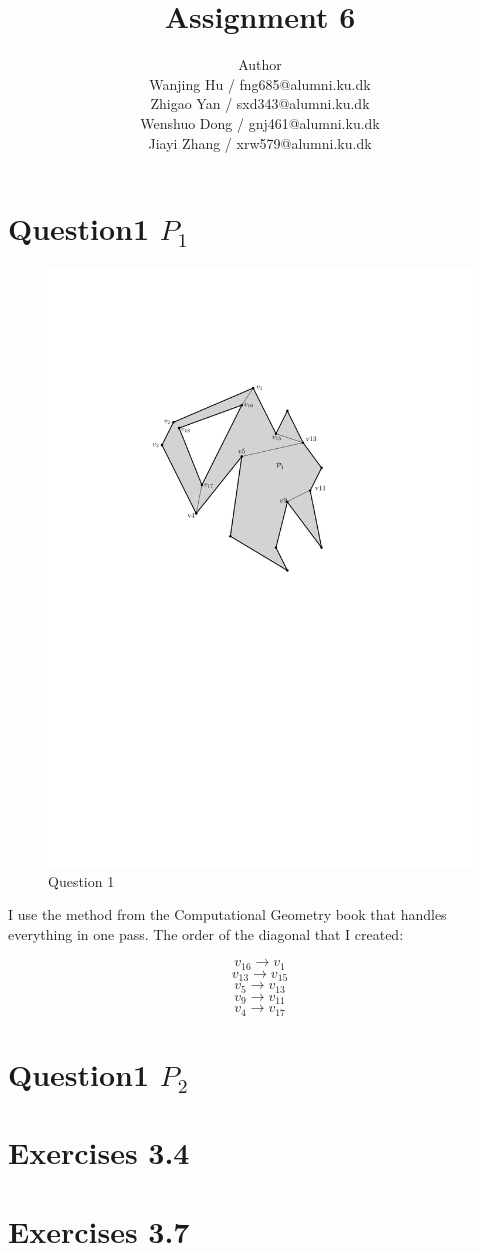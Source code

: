 \documentclass[12pt]{article}
\title{Assignment 6}
\author{Author \\
  Wanjing Hu / fng685@alumni.ku.dk  \\
  Zhigao Yan / sxd343@alumni.ku.dk  \\
  Wenshuo Dong / gnj461@alumni.ku.dk  \\
  Jiayi Zhang / xrw579@alumni.ku.dk \\
}
\begin{document}
\maketitle

\section{Question1 $P_1$}
\begin{figure}[h]
    \centering
    \includegraphics[width=0.5\linewidth]{triangulationExercise (2)-1.pdf}
    \caption{Question 1}
    \label{fig:enter-label}
\end{figure}
I use the method from the Computational Geometry book that handles everything in one pass.
The order of the diagonal that I created:

\[v_{16} \rightarrow v_1\]
\[v_{13} \rightarrow v_15\]
\[v_{5} \rightarrow v_{13}\]
\[v_{9} \rightarrow v_{11}\]
\[v_{4} \rightarrow v_{17}\]



\section{Question1 $P_2$}

\section{Exercises 3.4}

\section{Exercises 3.7}
\end{document}
